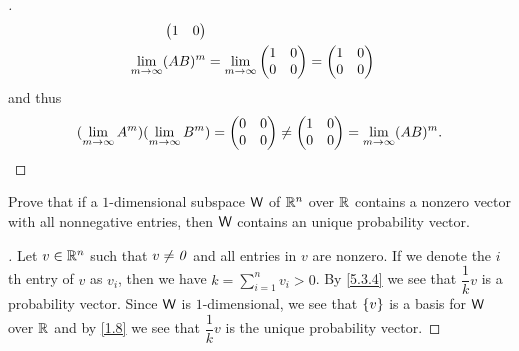 \begin{proof}[]
\begin{align*}
\begin{pmatrix}
                                                                         1 & 0
                                                                       \end{pmatrix}  \\
    \lim\limits_{m \to \infty} (AB)^m & = \lim\limits_{m \to \infty} \begin{pmatrix}
                                                         1 & 0 \\
                                                         0 & 0
                                                       \end{pmatrix} = \begin{pmatrix}
                                                                         1 & 0 \\
                                                                         0 & 0
                                                                       \end{pmatrix}
  \end{align*}
  and thus
  \[
    (\lim\limits_{m \to \infty} A^m) (\lim\limits_{m \to \infty} B^m) = \begin{pmatrix}
      0 & 0 \\
      0 & 0
    \end{pmatrix} \neq \begin{pmatrix}
      1 & 0 \\
      0 & 0
    \end{pmatrix} = \lim\limits_{m \to \infty} (AB)^m.
  \]
\end{proof}

\setcounter{ex}{14}
\begin{ex}\label{ex:5.3.15}
  Prove that if a \(1\)-dimensional subspace \(\mathsf{W}\) of \(\mathbb{R}^n\) over \(\mathbb{R}\) contains a nonzero vector with all nonnegative entries, then \(\mathsf{W}\) contains an unique probability vector.
\end{ex}

\begin{proof}[]
  Let \(v \in \mathbb{R}^n\) such that \(v \neq \mathit{0}\) and all entries in \(v\) are nonzero.
  If we denote the \(i\)th entry of \(v\) as \(v_i\), then we have \(k = \sum_{i = 1}^n v_i > 0\).
  By \cref{5.3.4} we see that \(\dfrac{1}{k} v\) is a probability vector.
  Since \(\mathsf{W}\) is \(1\)-dimensional, we see that \(\left\lbrace v\right\rbrace\) is a basis for \(\mathsf{W}\) over \(\mathbb{R}\) and by \cref{1.8} we see that \(\dfrac{1}{k} v\) is the unique probability vector.
\end{proof}


